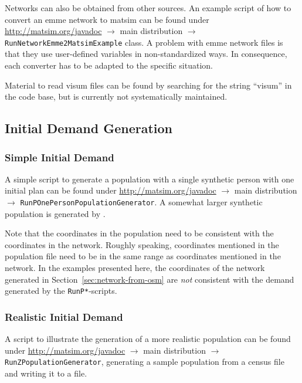 Networks can also be obtained from other sources.  An example script of how to convert an \gls{emme} network to \gls{matsim} can be found under \url{http://matsim.org/javadoc} $\to$ main distribution $\to$ \lstinline{RunNetworkEmme2MatsimExample} class.  A problem with \gls{emme} network files is that they use user-defined variables in non-standardized ways.  In consequence, each converter has to be adapted to the specific situation.

Material to read \gls{visum} files can be found by searching for the string ``visum'' in the code base, but is currently not systematically maintained.



\subsection{Initial Demand Generation}
\label{sec:extending-initial-demand}

\subsubsection{Simple Initial Demand}

A simple script to generate a population with a single synthetic person with one initial plan can be found under \url{http://matsim.org/javadoc} $\to$ main distribution $\to$ \lstinline{RunPOnePersonPopulationGenerator}.   A somewhat larger synthetic population is generated by .

Note that the coordinates in the population need to be consistent with the coordinates in the network.  Roughly speaking, coordinates mentioned in the population file need to be in the same range as coordinates mentioned in the network.  In the examples presented here, the coordinates of the network generated in Section~\ref{sec:network-from-osm} are \emph{not} consistent with the demand generated by the \lstinline{RunP*}-scripts.

\subsubsection{Realistic Initial Demand}

A script to illustrate the generation of a more realistic population can be found under \url{http://matsim.org/javadoc} $\to$ main distribution $\to$ \lstinline{RunZPopulationGenerator}, generating a sample population from a census file and writing it to a file.

